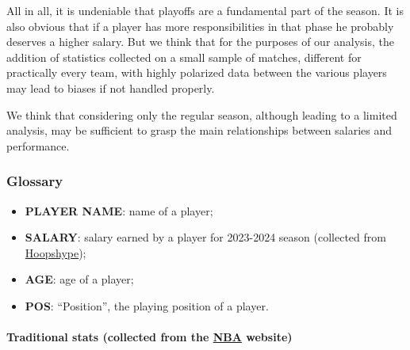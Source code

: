 \documentclass[
]{article}
\providecommand{\tightlist}{%
  \setlength{\itemsep}{0pt}\setlength{\parskip}{0pt}}
\begin{document}
All in all, it is undeniable that playoffs are a fundamental part of the
season. It is also obvious that if a player has more responsibilities in
that phase he probably deserves a higher salary. But we think that for
the purposes of our analysis, the addition of statistics collected on a
small sample of matches, different for practically every team, with
highly polarized data between the various players may lead to biases if
not handled properly.

We think that considering only the regular season, although leading to a
limited analysis, may be sufficient to grasp the main relationships
between salaries and performance.

\hypertarget{glossary}{%
\subsubsection{Glossary}\label{glossary}}

\begin{itemize}
\tightlist
\item
  \textbf{PLAYER NAME}: name of a player;
\item
  \textbf{SALARY}: salary earned by a player for 2023-2024 season
  (collected from \href{https://hoopshype.com/}{Hoopshype});
\item
  \textbf{AGE}: age of a player;
\item
  \textbf{POS}: ``Position'', the playing position of a player.
\end{itemize}

\hypertarget{traditional-stats-collected-from-the-nba-website}{%
\paragraph{\texorpdfstring{Traditional stats (collected from the
\href{https://www.nba.com/?47}{NBA}
website)}{Traditional stats (collected from the NBA website)}}\label{traditional-stats-collected-from-the-nba-website}}
\end{document}
